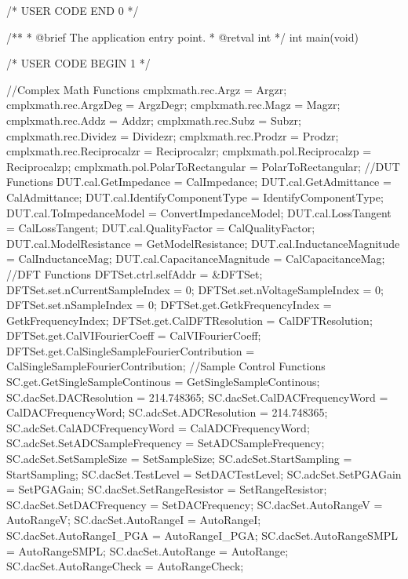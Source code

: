 /* USER CODE END 0 */

/**
  * @brief  The application entry point.
  * @retval int
  */
int main(void)
{

  /* USER CODE BEGIN 1 */

	//Complex Math Functions
	cmplxmath.rec.Argz = Argzr;
	cmplxmath.rec.ArgzDeg = ArgzDegr;
	cmplxmath.rec.Magz = Magzr;
	cmplxmath.rec.Addz = Addzr;
	cmplxmath.rec.Subz = Subzr;
	cmplxmath.rec.Dividez = Dividezr;
	cmplxmath.rec.Prodzr = Prodzr;
	cmplxmath.rec.Reciprocalzr = Reciprocalzr;
	cmplxmath.pol.Reciprocalzp = Reciprocalzp;
	cmplxmath.pol.PolarToRectangular = PolarToRectangular;
	//DUT Functions
	DUT.cal.GetImpedance = CalImpedance;
	DUT.cal.GetAdmittance = CalAdmittance;
	DUT.cal.IdentifyComponentType = IdentifyComponentType;
	DUT.cal.ToImpedanceModel = ConvertImpedanceModel;
	DUT.cal.LossTangent = CalLossTangent;
	DUT.cal.QualityFactor = CalQualityFactor;
	DUT.cal.ModelResistance = GetModelResistance;
	DUT.cal.InductanceMagnitude = CalInductanceMag;
	DUT.cal.CapacitanceMagnitude = CalCapacitanceMag;
	//DFT Functions
	DFTSet.ctrl.selfAddr = &DFTSet;
	DFTSet.set.nCurrentSampleIndex = 0;
	DFTSet.set.nVoltageSampleIndex = 0;
	DFTSet.set.nSampleIndex = 0;
	DFTSet.get.GetkFrequencyIndex = GetkFrequencyIndex;
	DFTSet.get.CalDFTResolution = CalDFTResolution;
	DFTSet.get.CalVIFourierCoeff = CalVIFourierCoeff;
	DFTSet.get.CalSingleSampleFourierContribution = CalSingleSampleFourierContribution;
	//Sample Control Functions
	SC.get.GetSingleSampleContinous = GetSingleSampleContinous;
	SC.dacSet.DACResolution = 214.748365;
	SC.dacSet.CalDACFrequencyWord = CalDACFrequencyWord;
	SC.adcSet.ADCResolution = 214.748365;
	SC.adcSet.CalADCFrequencyWord = CalADCFrequencyWord;
	SC.adcSet.SetADCSampleFrequency = SetADCSampleFrequency;
	SC.adcSet.SetSampleSize = SetSampleSize;
	SC.adcSet.StartSampling = StartSampling;
	SC.dacSet.TestLevel = SetDACTestLevel;
	SC.adcSet.SetPGAGain = SetPGAGain;
	SC.dacSet.SetRangeResistor = SetRangeResistor;
	SC.dacSet.SetDACFrequency = SetDACFrequency;
	SC.dacSet.AutoRangeV = AutoRangeV;
	SC.dacSet.AutoRangeI = AutoRangeI;
	SC.dacSet.AutoRangeI_PGA = AutoRangeI_PGA;
	SC.dacSet.AutoRangeSMPL = AutoRangeSMPL;
	SC.dacSet.AutoRange = AutoRange;
	SC.dacSet.AutoRangeCheck = AutoRangeCheck;

}
